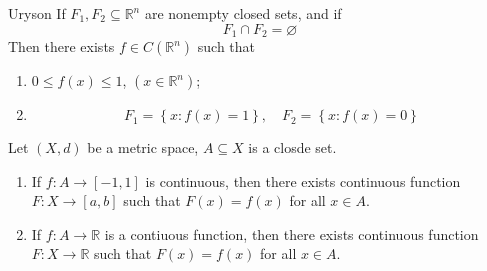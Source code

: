 \documentclass[../main.tex]{subfiles}
\begin{document}
\begin{lemma}{Uryson}{}
    If \(  F_1,F_2\subseteq \mathbb{R} ^{n}  \) are nonempty closed sets, and if \[
    F_1\cap F_2= \varnothing
    \]Then there exists \(  f \in C\left( \mathbb{R} ^{n} \right)   \) such that 
    \begin{enumerate}
        \item \(  0\le f\left( x \right)\le 1   \), \(  \left( x\in \mathbb{R} ^{n} \right)   \);
        \item \[
        F_1= \left\{ x:f\left( x \right)= 1  \right\},\quad F_2= \left\{ x:f\left( x \right)= 0  \right\}
        \]   
    \end{enumerate}
      
\end{lemma}

\begin{theorem}{}{}
    Let \(  \left( X,d \right)   \) be a metric space, \(  A\subseteq X  \) is a closde set. 
    \begin{enumerate}
        \item If \(  f:A\to \left[ -1,1 \right]   \) is continuous, then there exists continuous function \(  F:X\to \left[ a,b \right]   \)   such that \(  F\left( x \right)= f\left( x \right)    \) for all \(  x \in A  \).
        \item If \(  f:A\to \mathbb{R}   \) is a contiuous function, then there exists continuous function \(  F:X\to \mathbb{R}   \) such that \(  F\left( x \right)= f\left( x \right)    \) for all \(  x \in A  \).     
    \end{enumerate}
      
\end{theorem}
\end{document}
